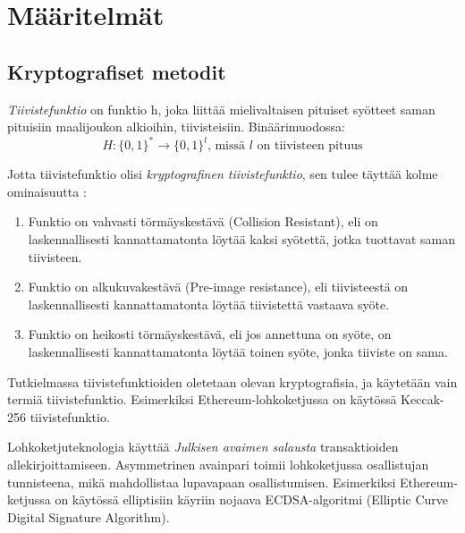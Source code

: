 \chapter{Määritelmät\label{methods}}

\section{Kryptografiset metodit}
\textit{Tiivistefunktio} on funktio h, joka liittää mielivaltaisen pituiset syötteet saman pituisiin maalijoukon alkioihin, tiivisteisiin. Binäärimuodossa: 
\begin{equation}
    H : \{0, 1\}^* \longrightarrow  \{0, 1\}^l \text{, missä $l$ on tiivisteen pituus}
\end{equation}

Jotta tiivistefunktio olisi \textit{kryptografinen tiivistefunktio}, sen tulee täyttää kolme ominaisuutta \cite{cryptoeprint:2011:565}: 
\begin{enumerate}
    \item Funktio on vahvasti törmäyskestävä (Collision Resistant), eli on laskennallisesti kannattamatonta löytää kaksi syötettä, jotka tuottavat saman tiivisteen.
    \item Funktio on alkukuvakestävä (Pre-image resistance), eli tiivisteestä on laskennallisesti kannattamatonta löytää tiivistettä vastaava syöte.
    \item Funktio on heikosti törmäyskestävä, eli jos annettuna on syöte, on laskennallisesti kannattamatonta löytää toinen syöte, jonka tiiviste on sama.
\end{enumerate}

Tutkielmassa tiivistefunktioiden oletetaan olevan kryptografisia, ja käytetään vain termiä tiivistefunktio. Esimerkiksi Ethereum-lohkoketjussa on käytössä Keccak-256 tiivistefunktio.

 Lohkoketjuteknologia käyttää \textit{Julkisen avaimen salausta} transaktioiden allekirjoittamiseen. Asymmetrinen avainpari toimii lohkoketjussa osallistujan tunnisteena, mikä mahdollistaa lupavapaan osallistumisen. Esimerkiksi Ethereum-ketjussa on käytössä elliptisiin käyriin nojaava ECDSA-algoritmi (Elliptic Curve Digital Signature Algorithm). 


